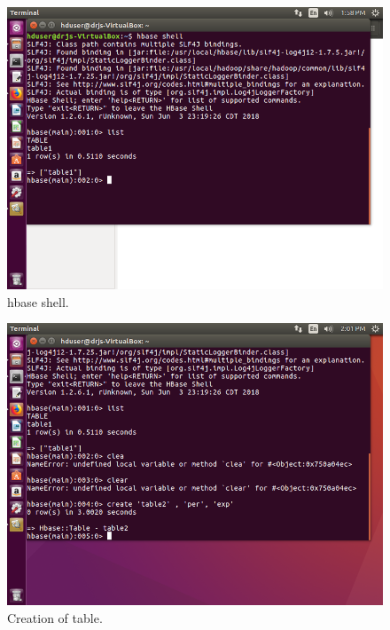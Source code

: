 \documentclass[a4paper,10pt]{article}
\begin{document}
\begin{figure}[h]
	\includegraphics[scale=0.33,center]{11.png}
	\caption{hbase shell.}
	\label{fig:1}
\end{figure}

\begin{figure}[h]
	\includegraphics[scale=0.33,center]{12.png}
	\caption{Creation of table.}
	\label{fig:1}
\end{figure}
\end{document}
